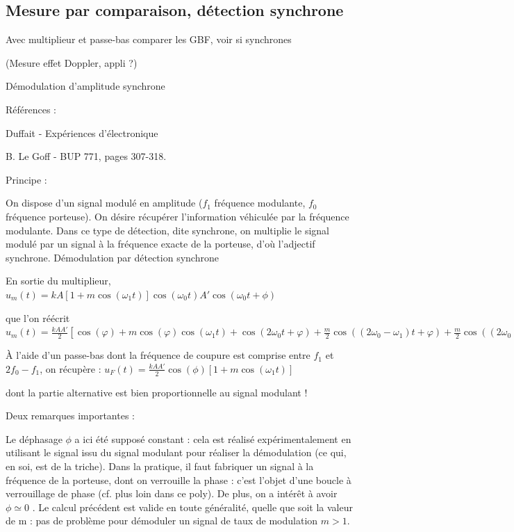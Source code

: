 \documentclass{article}%
\begin{document}
\subsection{Mesure par comparaison, détection synchrone}
Avec multiplieur et passe-bas comparer les GBF, voir si synchrones

(Mesure effet Doppler, appli ?)

Démodulation d'amplitude synchrone

Références :

Duffait - Expériences d'électronique

B. Le Goff - BUP 771, pages 307-318.


Principe :

On dispose d'un signal modulé en amplitude ($f_{1}$ fréquence modulante, $f_{0}$ fréquence porteuse). On désire récupérer l'information véhiculée par la fréquence modulante. Dans ce type de détection, dite synchrone, on multiplie le signal modulé par un signal à la fréquence exacte de la porteuse, d'où l'adjectif synchrone.
Démodulation par détection synchrone

En sortie du multiplieur,
$u_m(t) = kA[1 + m \cos (\omega_1 t)] \cos (\omega_0 t)A' \cos (\omega_0 t + \phi) $

que l'on réécrit
$u_m(t) = \frac{k A A'}{2} \left[\cos(\varphi) + m \cos(\varphi) \cos(\omega _{1} t) + \cos(2 \omega_0 t + \varphi) + \frac{m}{2}\cos((2\omega_0 - \omega_1)t + \varphi) + \frac{m}{2}\cos((2\omega_0 + \omega_1)t + \varphi) \right]$

À l'aide d'un passe-bas dont la fréquence de coupure est comprise entre $f_1$ et $2f_0 - f_1$, on récupère :
$u_F(t) = \frac{k A A'}{2} \cos(\phi) \left[ 1+ m \cos(\omega_1 t) \right] $

dont la partie alternative est bien proportionnelle au signal modulant !

Deux remarques importantes :

    Le déphasage $\phi$ a ici été supposé constant : cela est réalisé expérimentalement en utilisant le signal issu du signal modulant pour réaliser la démodulation (ce qui, en soi, est de la triche). Dans la pratique, il faut fabriquer un signal à la fréquence de la porteuse, dont on verrouille la phase : c'est l'objet d'une boucle à verrouillage de phase (cf. plus loin dans ce poly). De plus, on a intérêt à avoir $\phi \simeq 0$ .
    Le calcul précédent est valide en toute généralité, quelle que soit la valeur de m : pas de problème pour démoduler un signal de taux de modulation $m > 1$.
\end{document}

